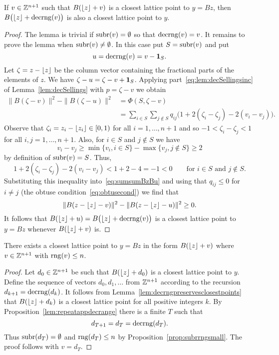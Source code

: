 \documentclass[final,leqno]{siamltex}
\begin{document}
\begin{lemma}\label{lem:decrngpreservesclosestpoints}
If $v \in {\mathbb Z}^{n+1}$ such that $B({\left\lfloor z \right\rfloor} + v)$ is a closest lattice point to $y = Bz$, then $B\big({\left\lfloor z \right\rfloor} + \operatorname{decrng}(v)\big)$ is also a closest lattice point to $y$.
\end{lemma}
\begin{proof}
The lemma is trivial if $\operatorname{subr}(v) = \emptyset$ so that $\operatorname{decrng}(v) = v$.  It remains to prove the lemma when $\operatorname{subr}(v) \neq \emptyset$.  In this case put $S = \operatorname{subr}(v)$ and put 
\[
u = \operatorname{decrng}(v) = v - \boldsymbol{1}_S.
\] 
Let $\zeta = z - {\left\lfloor z \right\rfloor}$ be the column vector containing the fractional parts of the elements of $z$.  We have $\zeta - u = \zeta - v + \boldsymbol{1}_S$.  Applying part~\ref{eq:lem:decSellingsinc} of Lemma~\ref{lem:decSellings} with $p = \zeta - v$ we obtain
\begin{align}
\|B(\zeta - v)\|^2 - \|B(\zeta - u)\|^2 &= \Phi(S, \zeta-v) \nonumber \\
&= \sum_{i \in S}\sum_{j \notin S}q_{ij}\big(1 + 2(\zeta_i-\zeta_j) - 2(v_i - v_j)\big). \label{eq:sumsumBzBu}
\end{align}
Observe that $\zeta_i =  z_i - {\left\lfloor z_i \right\rfloor} \in [0,1)$ for all $i=1,\dots,n+1$ and so $-1 < \zeta_i-\zeta_j < 1$ for all $i,j=1,\dots,n+1$.  Also, for $i \in S$ and $j\notin S$ we have 
\[
v_i - v_j \geq \min\{ v_i, i \in S\} - \max\{v_j, j \notin S\} \geq 2
\]
by definition of $\operatorname{subr}(v) = S$.  Thus,
\[
1 + 2(\zeta_i-\zeta_j) - 2(v_i - v_j) < 1 + 2 - 4 = -1 < 0 \qquad \text{for $i \in S$ and $j \notin S$}.
\]
Substituting this inequality into~\eqref{eq:sumsumBzBu} and using that $q_{ij} \leq 0$ for $i \neq j$ (the obtuse condition~\eqref{eq:obtusecond}) we find that
\[
\|B(z - {\left\lfloor z \right\rfloor} - v)\|^2 - \|B(z - {\left\lfloor z \right\rfloor} - u)\|^2 \geq 0.
\]
It follows that $B({\left\lfloor z \right\rfloor} + u) = B\big({\left\lfloor z \right\rfloor} + \operatorname{decrng}(v)\big)$ is a closest lattice point to $y = Bz$ whenever $B({\left\lfloor z \right\rfloor} + v)$ is.
\end{proof}

\begin{lemma}\label{lem:roundzclose}
There exists a closest lattice point to $y = Bz$ in the form $B({\left\lfloor z \right\rfloor} + v)$ where $v \in {\mathbb Z}^{n+1}$ with $\operatorname{rng}(v) \leq n$.
\end{lemma}
\begin{proof}
Let $d_0 \in {\mathbb Z}^{n+1}$ be such that $B({\left\lfloor z \right\rfloor} + d_0)$ is a closest lattice point to $y$. Define the sequence of vectors $d_0,d_1,\dots$ from ${\mathbb Z}^{n+1}$ according to the recursion $d_{k+1} = \operatorname{decrng}(d_k)$.  It follows from Lemma~\ref{lem:decrngpreservesclosestpoints} that $B({\left\lfloor z \right\rfloor} + d_{k})$ is a closest lattice point for all positive integers $k$.  By Proposition~\ref{lem:repeatappdecrange} there is a finite $T$ such that 
\[
d_{T+1}=d_T=\operatorname{decrng}(d_T).
\]  
Thus $\operatorname{subr}(d_T) = \emptyset$ and $\operatorname{rng}(d_T) \leq n$ by Proposition~\ref{prop:subrrngsmall}.  The proof follows with $v = d_T$.   
\end{proof}
\end{document}
